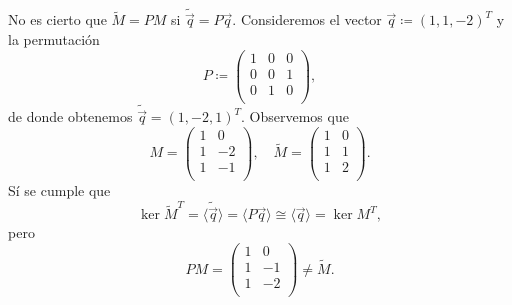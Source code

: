 \begin{observation}
	No es cierto que $\tilde{M} = PM$ si $\tilde{\vec{q}} = P\vec{q}$. Consideremos el vector
	$\vec{q} \coloneq (1, 1, -2)^T$ y la permutación
	\begin{equation*}
		P \coloneq \begin{pmatrix}
			1 & 0 & 0 \\
			0 & 0 & 1 \\
			0 & 1 & 0 \\
		\end{pmatrix},
	\end{equation*}
	de donde obtenemos $\tilde{\vec{q}} = (1, -2, 1)^T$. Observemos que
	\begin{equation*}
		M = \begin{pmatrix}
			1 & 0 \\
			1 & -2 \\
			1 & -1 \\
		\end{pmatrix}, \quad
		\tilde{M} = \begin{pmatrix}
			1 & 0 \\
			1 & 1 \\
			1 & 2 \\
		\end{pmatrix}.
	\end{equation*}
	Sí se cumple que
	\begin{equation*}
		\ker{\tilde{M}^T} = \langle \tilde{\vec{q}} \rangle = \langle P\vec{q} \rangle
		\cong \langle \vec{q} \rangle = \ker{M^T},
	\end{equation*}
	pero
	\begin{equation*}
		PM = \begin{pmatrix}
			1 & 0 \\
			1 & -1 \\
			1 & -2 \\
		\end{pmatrix}
		\neq \tilde{M}.
	\end{equation*}
\end{observation}

